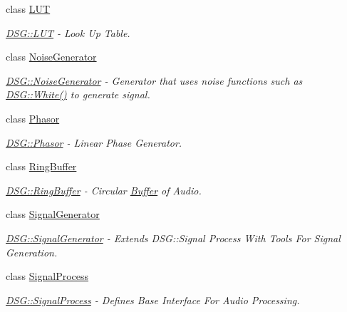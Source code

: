 \begin{DoxyCompactItemize}
class \hyperlink{class_d_s_g_1_1_l_u_t}{L\+U\+T}
\begin{DoxyCompactList}\small\item\em \hyperlink{class_d_s_g_1_1_l_u_t}{D\+S\+G\+::\+L\+U\+T} -\/ Look Up Table. \end{DoxyCompactList}\item 
class \hyperlink{class_d_s_g_1_1_noise_generator}{Noise\+Generator}
\begin{DoxyCompactList}\small\item\em \hyperlink{class_d_s_g_1_1_noise_generator}{D\+S\+G\+::\+Noise\+Generator} -\/ Generator that uses noise functions such as \hyperlink{namespace_d_s_g_1_1_noise_a0d1c4b4522d2e56b1aa604e45ab92066}{D\+S\+G\+::\+White()} to generate signal. \end{DoxyCompactList}\item 
class \hyperlink{class_d_s_g_1_1_phasor}{Phasor}
\begin{DoxyCompactList}\small\item\em \hyperlink{class_d_s_g_1_1_phasor}{D\+S\+G\+::\+Phasor} -\/ Linear Phase Generator. \end{DoxyCompactList}\item 
class \hyperlink{class_d_s_g_1_1_ring_buffer}{Ring\+Buffer}
\begin{DoxyCompactList}\small\item\em \hyperlink{class_d_s_g_1_1_ring_buffer}{D\+S\+G\+::\+Ring\+Buffer} -\/ Circular \hyperlink{class_d_s_g_1_1_buffer}{Buffer} of Audio. \end{DoxyCompactList}\item 
class \hyperlink{class_d_s_g_1_1_signal_generator}{Signal\+Generator}
\begin{DoxyCompactList}\small\item\em \hyperlink{class_d_s_g_1_1_signal_generator}{D\+S\+G\+::\+Signal\+Generator} -\/ Extends D\+S\+G\+::\+Signal Process With Tools For Signal Generation. \end{DoxyCompactList}\item 
class \hyperlink{class_d_s_g_1_1_signal_process}{Signal\+Process}
\begin{DoxyCompactList}\small\item\em \hyperlink{class_d_s_g_1_1_signal_process}{D\+S\+G\+::\+Signal\+Process} -\/ Defines Base Interface For Audio Processing. \end{DoxyCompactList}\end{DoxyCompactItemize}
